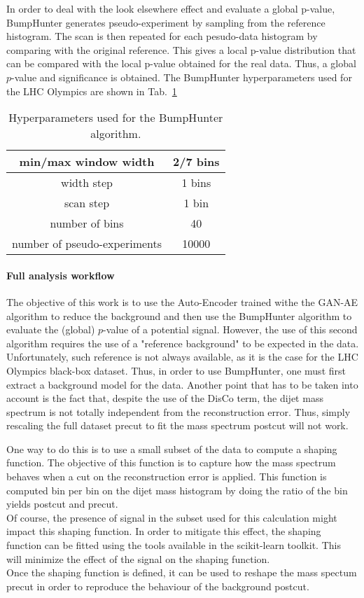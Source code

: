 \documentclass[a4paper,11pt]{article}
\begin{document}
 In order to deal with the look elsewhere effect and evaluate a global p-value, BumpHunter generates pseudo-experiment by sampling from the reference histogram.
The scan is then repeated for each pesudo-data histogram by comparing with the original reference.
This gives a local p-value distribution that can be compared with the local p-value obtained for the real data.
Thus, a global $p$-value and significance is obtained. The BumpHunter hyperparameters used for the LHC Olympics are shown in Tab.~\ref{tab:param_BH}
\begin{table}[h!]
	\centering
	\begin{tabular}{|c|c|}
		\hline
		min/max window width & 2/7 bins \\
		\hline
		width step & 1 bins \\
		\hline
		scan step & 1 bin \\
		\hline
		number of bins & 40 \\
		\hline
		number of pseudo-experiments & 10000 \\
		\hline
	\end{tabular}
	\caption{Hyperparameters used for the BumpHunter algorithm.}
	\label{tab:param_BH}
\end{table}

\paragraph{Full analysis workflow}

The objective of this work is to use the Auto-Encoder trained withe the GAN-AE algorithm to reduce the background and then use the BumpHunter algorithm to evaluate the (global) $p$-value of a potential signal.  However, the use of this second algorithm requires the use of a "reference background" to be expected in the data.
Unfortunately, such reference is not always available, as it is the case for the LHC Olympics black-box dataset.
Thus, in order to use BumpHunter, one must first extract a background model for the data. Another point that has to be taken into account is the fact that, despite the use of the DisCo term, the dijet mass spectrum is not totally independent from the reconstruction error. Thus, simply rescaling the full dataset precut to fit the mass spectrum postcut will not work. 

One way to do this is to use a small subset of the data to compute a shaping function.
The objective of this function is to capture how the mass spectrum behaves when a cut on the reconstruction error is applied.
This function is computed bin per bin on the dijet mass histogram by doing the ratio of the bin yields postcut and precut.\\
Of course, the presence of signal in the subset used for this calculation might impact this shaping function.
In order to mitigate this effect, the shaping function can be fitted using the tools available in the scikit-learn toolkit.
This will minimize the effect of the signal on the shaping function.\\
Once the shaping function is defined, it can be used to reshape the mass spectum precut in order to reproduce the behaviour of the background postcut.\\
\end{document}
